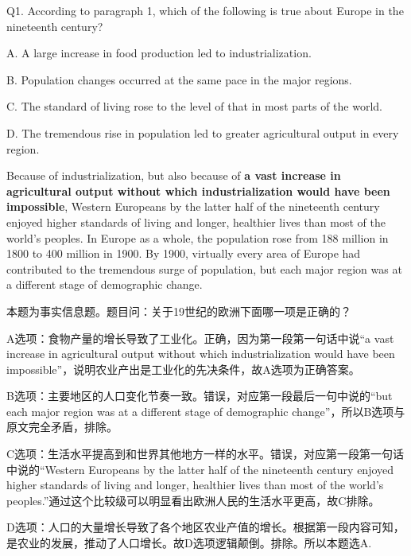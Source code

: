 \begin{blk}
    \begin{qst}
        Q1. According to paragraph 1, which of the following is true about Europe in the nineteenth century?
    \end{qst}

    \begin{chc}
        A. A large increase in food production led to industrialization.

        B. Population changes occurred at the same pace in the major regions.

        C. The standard of living rose to the level of that in most parts of the world.

        D. The tremendous rise in population led to greater agricultural output in every region.
    \end{chc}

    \begin{psgq}
        Because of industrialization, but also because of \textbf{a vast increase in agricultural output without which industrialization would have been impossible}, Western Europeans by the latter half of the nineteenth century enjoyed higher standards of living and longer, healthier lives than most of the world’s peoples. In Europe as a whole, the population rose from 188 million in 1800 to 400 million in 1900. By 1900, virtually every area of Europe had contributed to the tremendous surge of population, but each major region was at a different stage of demographic change.
    \end{psgq}

    \begin{nlz}
        本题为事实信息题。题目问：关于19世纪的欧洲下面哪一项是正确的？

        A选项：食物产量的增长导致了工业化。正确，因为第一段第一句话中说“a vast increase in agricultural output without which industrialization would have been impossible”，说明农业产出是工业化的先决条件，故A选项为正确答案。

        B选项：主要地区的人口变化节奏一致。错误，对应第一段最后一句中说的“but each major region was at a different stage of demographic change”，所以B选项与原文完全矛盾，排除。

        C选项：生活水平提高到和世界其他地方一样的水平。错误，对应第一段第一句话中说的“Western Europeans by the latter half of the nineteenth century enjoyed higher standards of living and longer, healthier lives than most of the world’s peoples.”通过这个比较级可以明显看出欧洲人民的生活水平更高，故C排除。

        D选项：人口的大量增长导致了各个地区农业产值的增长。根据第一段内容可知，是农业的发展，推动了人口增长。故D选项逻辑颠倒。排除。所以本题选A.
    \end{nlz}
\end{blk}
